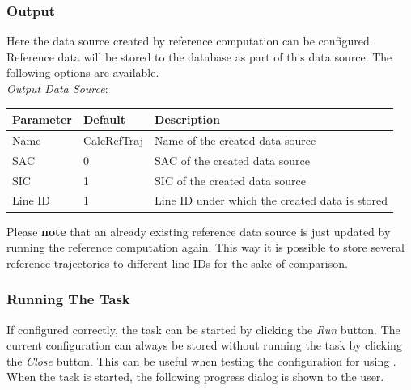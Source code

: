 \subsubsection{Output}


Here the data source created by reference computation can be configured. 
Reference data will be stored to the database as part of this data source.
The following options are available. \\

\textit{Output Data Source}:
\begin{table}[H]
    \center
    \begin{tabularx}{\textwidth}{ | l | l | X |}
        \hline
        \textbf{Parameter} & \textbf{Default} & \textbf{Description} \\ \hline
        Name & CalcRefTraj & Name of the created data source \\ \hline
        SAC & 0 & SAC of the created data source \\ \hline
        SIC & 1 & SIC of the created data source \\ \hline
        Line ID & 1 & Line ID under which the created data is stored \\ \hline
    \end{tabularx}
\end{table}

Please \textbf{note} that an already existing reference data source is just updated by running the 
reference computation again. This way it is possible to store several reference trajectories to 
different line IDs for the sake of comparison.

\subsubsection{Running The Task}

If configured correctly, the task can be started by clicking the \textit{Run} button.
The current configuration can always be stored without running the task by clicking the \textit{Close} button. 
This can be useful when testing the configuration for using . \\

When the task is started, the following progress dialog is shown to the user.

